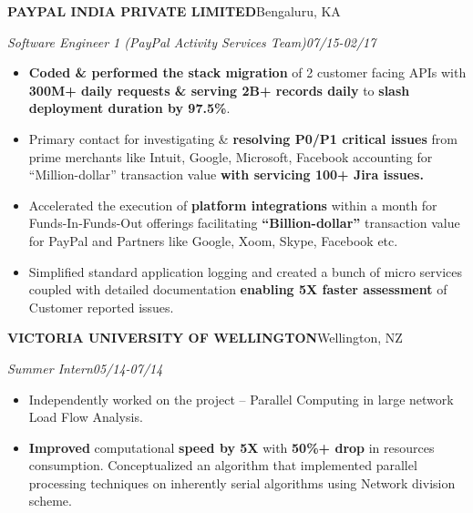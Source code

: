 \documentclass[10pt,letterpaper]{article}
\newlength{\entrygap}      \setlength{\entrygap}{8pt}
\newcommand{\bd}[1]{\textbf{#1}}
\newcommand{\entry}[4]{%
  \par\vspace{\entrygap}%
  \noindent\textbf{#1}\hfill #2\par
  \noindent\textcolor{rolecolor}{\textit{#3}}\hfill\textcolor{rolecolor}{\textit{#4}}\par
  \nopagebreak}
\begin{document}
\entry{PAYPAL INDIA PRIVATE LIMITED}{Bengaluru, KA}
      {Software Engineer 1 (PayPal Activity Services Team)}{07/15-02/17}
\begin{itemize}
\item \bd{Coded \& performed the stack migration} of 2 customer facing APIs with
  \bd{300M+ daily requests \& serving 2B+ records daily} to \bd{slash deployment duration by
  97.5\%}.
\item Primary contact for investigating \& \bd{resolving P0/P1 critical issues} from prime
  merchants like Intuit, Google, Microsoft, Facebook accounting for ``Million-dollar''
  transaction value \bd{with servicing 100+ Jira issues.}
\item Accelerated the execution of \bd{platform integrations} within a month for
  Funds-In-Funds-Out offerings facilitating \bd{``Billion-dollar''} transaction value for
  PayPal and Partners like Google, Xoom, Skype, Facebook etc.
\item Simplified standard application logging and created a bunch of micro services
  coupled with detailed documentation \bd{enabling 5X faster assessment} of Customer
  reported issues.
\end{itemize}

\vspace{7.8pt}
\entry{VICTORIA UNIVERSITY OF WELLINGTON}{Wellington, NZ}
      {Summer Intern}{05/14-07/14}
\begin{itemize}
\item Independently worked on the project -- Parallel Computing in large network Load Flow
  Analysis.
\item \bd{Improved} computational \bd{speed by 5X} with \bd{50\%+ drop} in resources
  consumption. Conceptualized an algorithm that implemented parallel processing techniques
  on inherently serial algorithms using Network division scheme.
\end{itemize}
\end{document}
